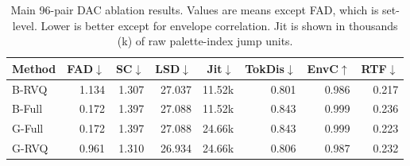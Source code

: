 \documentclass[twoside,a4paper]{article}
\begin{document}
\begin{table}[!t]
    \centering
    \scriptsize
    \setlength{\tabcolsep}{1.4pt}
    \caption{Main 96-pair DAC ablation results. Values are means except FAD, which is set-level. Lower is better except for envelope correlation. Jit is shown in thousands (k) of raw palette-index jump units.}
    \label{tab:dac-main}
    \begin{tabular}{lrrrrrrr}
    \toprule
    Method & FAD$\downarrow$ & SC$\downarrow$ & LSD$\downarrow$ & Jit$\downarrow$ & TokDis$\downarrow$ & EnvC$\uparrow$ & RTF$\downarrow$ \\
    \midrule
    B-RVQ & 1.134 & 1.307 & 27.037 & 11.52k & 0.801 & 0.986 & 0.217 \\
    B-Full & 0.172 & 1.397 & 27.088 & 11.52k & 0.843 & 0.999 & 0.236 \\
    G-Full & 0.172 & 1.397 & 27.088 & 24.66k & 0.843 & 0.999 & 0.223 \\
    G-RVQ & 0.961 & 1.310 & 26.934 & 24.66k & 0.806 & 0.987 & 0.232 \\
    \bottomrule
    \end{tabular}
\end{table}
\end{document}
